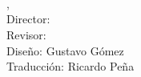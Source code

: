 \begin{titlepage}
	\thesisDate \\

\end{titlepage}


\hfill
\vfill
{
	\small
	\textbf{\thesisName} \\
	\textit{\thesisTitle} \\
	\thesisSubject, \thesisDate \\
	Director: \thesisFirstReviewer \\
	Revisor: \thesisSecondReviewer \\
	Diseño: Gustavo Gómez \\
	Traducción: Ricardo Peña \\[1.5em]
	\textbf{\thesisUniversity} \\
	\textit{\thesisUniversityGroup} \\
	\thesisUniversityInstitute \\
	\thesisUniversityDepartment \\
	\thesisUniversityStreetAddress \\
	\thesisUniversityCity \\
	\thesisUniversityPostalCode
}